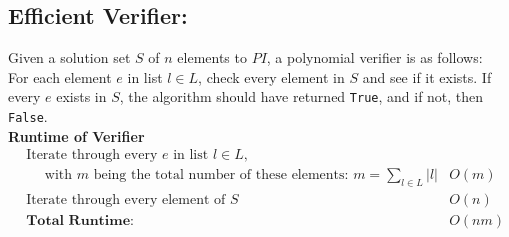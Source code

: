 \documentclass[11pt]{article}
\begin{document}
\subsection{Efficient Verifier:}
Given a solution set $S$ of $n$ elements to $PI$, a polynomial verifier is as follows:\\

For each element $e$ in list $l \in L$, check every element in $S$ and see if it exists. If every $e$ exists in $S$, the algorithm should have returned \texttt{True}, and if not, then \texttt{False}. \\

\textbf{Runtime of Verifier }
\begin{align*}
&\text{Iterate through every $e$ in list $l \in L$,}\\
&\text{$\quad$ with $m$ being the total number of these elements: $m = \sum_{l \in L} |l|$} &O(m)\\ 
&\text{Iterate through every element of $S$ } &O(n)\\ 
&\textbf{Total Runtime: } &O(nm)\\
\end{align*}

\lobsectionbreak

\vspace*{2.7cm}
\hspace*{7cm} 
 \hfill
\vspace*{-.7cm}
\end{document}
